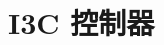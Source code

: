\documentclass[main\_\_CN.tex]{subfiles}
\begin{document}

\ifglobal
\else
    {\let\clearpage\relax \listoftodos}
    {\let\clearpage\relax \listofdonetodos}
    \tableofcontents
\fi



\hypertarget{i3c}{}
\chapter{I3C 控制器}


\label{mod:i3c}



\end{document}
